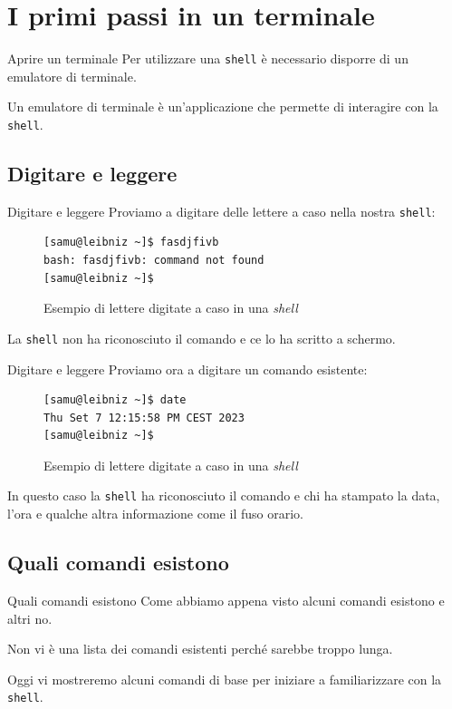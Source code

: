 \documentclass{beamer}
\begin{document}
\section{I primi passi in un terminale}
\begin{frame}{Aprire un terminale}
  Per utilizzare una \texttt{shell} è necessario disporre di un emulatore di 
  terminale.\bigskip

  Un emulatore di terminale è un'applicazione che permette di interagire con
  la \texttt{shell}.
\end{frame}

\subsection{Digitare e leggere}
\begin{frame}[fragile]{Digitare e leggere}
  Proviamo a digitare delle lettere a caso nella nostra \texttt{shell}:
  \begin{figure}
    \begin{lstlisting}
[samu@leibniz ~]$ fasdjfivb
bash: fasdjfivb: command not found
[samu@leibniz ~]$ 
    \end{lstlisting}
    \caption{Esempio di lettere digitate a caso in una \textit{shell}}
  \end{figure}
  \pause
  La \texttt{shell} non ha riconosciuto il comando e ce lo ha scritto a schermo.
\end{frame}

\begin{frame}[fragile]{Digitare e leggere}
  Proviamo ora a digitare un comando esistente:
  \begin{figure}
        \begin{lstlisting}
[samu@leibniz ~]$ date
Thu Set 7 12:15:58 PM CEST 2023
[samu@leibniz ~]$
    \end{lstlisting}
    \caption{Esempio di lettere digitate a caso in una \textit{shell}}
  \end{figure}
  \pause
  In questo caso la \texttt{shell} ha riconosciuto il comando e chi ha stampato
  la data, l'ora e qualche altra informazione come il fuso orario.
\end{frame}

\subsection{Quali comandi esistono}
\begin{frame}{Quali comandi esistono}
  Come abbiamo appena visto alcuni comandi esistono e altri no.\bigskip

  Non vi è una lista dei comandi esistenti perché sarebbe troppo lunga.\bigskip

  Oggi vi mostreremo alcuni comandi di base per iniziare a familiarizzare con la
  \texttt{shell}.
\end{frame}
\end{document}
